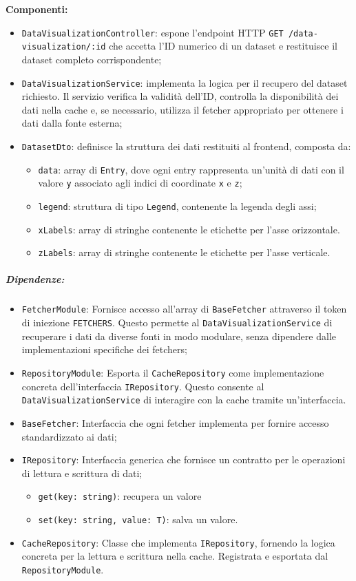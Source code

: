 \textbf{Componenti:}
\begin{itemize}
    \item \texttt{DataVisualizationController}: espone l'endpoint HTTP \texttt{GET /data-visualization/:id} che accetta l'ID numerico di un dataset e restituisce il dataset completo corrispondente;
    \item \texttt{DataVisualizationService}: implementa la logica per il recupero del dataset richiesto. Il servizio verifica la validità dell'ID, controlla la disponibilità dei dati nella cache e, se necessario, utilizza il fetcher appropriato per ottenere i dati dalla fonte esterna;
    \item \texttt{DatasetDto}: definisce la struttura dei dati restituiti al frontend, composta da:
    \begin{itemize}
        \item \texttt{data}: array di \texttt{Entry}, dove ogni entry rappresenta un'unità di dati con il valore \texttt{y} associato agli indici di coordinate \texttt{x} e \texttt{z};
        \item \texttt{legend}: struttura di tipo \texttt{Legend}, contenente la legenda degli assi;
        \item \texttt{xLabels}: array di stringhe contenente le etichette per l'asse orizzontale.
        \item \texttt{zLabels}: array di stringhe contenente le etichette per l'asse verticale.
    \end{itemize}
\end{itemize}

\subparagraph{Dipendenze:}

\begin{itemize}
    \item \texttt{FetcherModule}: Fornisce accesso all'array di \texttt{BaseFetcher} attraverso il token di iniezione \texttt{FETCHERS}. Questo permette al \texttt{DataVisualizationService} di recuperare i dati da diverse fonti in modo modulare, senza dipendere dalle implementazioni specifiche dei fetchers;
    \item \texttt{RepositoryModule}: Esporta il \texttt{CacheRepository} come implementazione concreta dell'interfaccia \texttt{IRepository}. Questo consente al \texttt{DataVisualizationService} di interagire con la cache tramite un'interfaccia.
    \item \texttt{BaseFetcher}: Interfaccia che ogni fetcher implementa per fornire accesso standardizzato ai dati;
    \item \texttt{IRepository}: Interfaccia generica che fornisce un contratto per le operazioni di lettura e scrittura di dati;
    \begin{itemize}
        \item \texttt{get(key: string)}: recupera un valore
        \item \texttt{set(key: string, value: T)}: salva un valore.
    \end{itemize}
    \item \texttt{CacheRepository}: Classe che implementa \texttt{IRepository}, fornendo la logica concreta per la lettura e scrittura nella cache. Registrata e esportata dal \texttt{RepositoryModule}.
\end{itemize}


